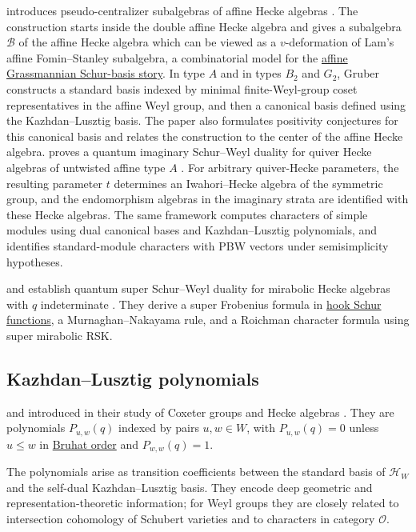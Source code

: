  introduces pseudo-centralizer subalgebras of affine
Hecke algebras \cite{Gruber2026x}.  The construction starts inside the double
affine Hecke algebra and gives a subalgebra $\mathcal{B}$ of the affine Hecke
algebra which can be viewed as a $v$-deformation of Lam's affine
Fomin--Stanley subalgebra, a combinatorial model for the
\hyperref[schurAffine]{affine Grassmannian Schur-basis story}.  In type $A$
and in types $B_2$ and $G_2$, Gruber constructs a standard basis indexed by
minimal finite-Weyl-group coset representatives in the affine Weyl group, and
then a canonical basis defined using the Kazhdan--Lusztig basis.  The paper
also formulates positivity conjectures for this canonical basis and relates
the construction to the center of the affine Hecke algebra.
 proves a quantum imaginary Schur--Weyl duality for
quiver Hecke algebras of untwisted affine type $A$ \cite{Murata2026x}.
For arbitrary quiver-Hecke parameters, the resulting parameter $t$ determines
an Iwahori--Hecke algebra of the symmetric group, and the endomorphism
algebras in the imaginary strata are identified with these Hecke algebras.
The same framework computes characters of simple modules using dual canonical
bases and Kazhdan--Lusztig polynomials, and identifies standard-module
characters with PBW vectors under semisimplicity hypotheses.

 and  establish quantum super Schur--Weyl
duality for mirabolic Hecke algebras with $q$ indeterminate
\cite{JingLiu2026Mirabolic}. They derive a super Frobenius formula in
\hyperref[hookSchur]{hook Schur functions}, a Murnaghan--Nakayama rule,
and a Roichman character formula using super mirabolic RSK.

\subsection[kazhdanLusztigPolynomials]{Kazhdan--Lusztig polynomials}

 and  introduced
 in their study of Coxeter groups and
Hecke algebras \cite{KazhdanLusztig1979}.  They are polynomials
$P_{u,w}(q)$ indexed by pairs $u,w\in W$, with $P_{u,w}(q)=0$ unless
$u\leq w$ in \hyperref[bruhatOrder]{Bruhat order} and $P_{w,w}(q)=1$.

The polynomials arise as transition coefficients between the standard basis of
$\mathcal{H}_W$ and the self-dual Kazhdan--Lusztig basis.  They encode deep
geometric and representation-theoretic information; for Weyl groups they are
closely related to intersection cohomology of Schubert varieties and to
characters in category $\mathcal{O}$.

